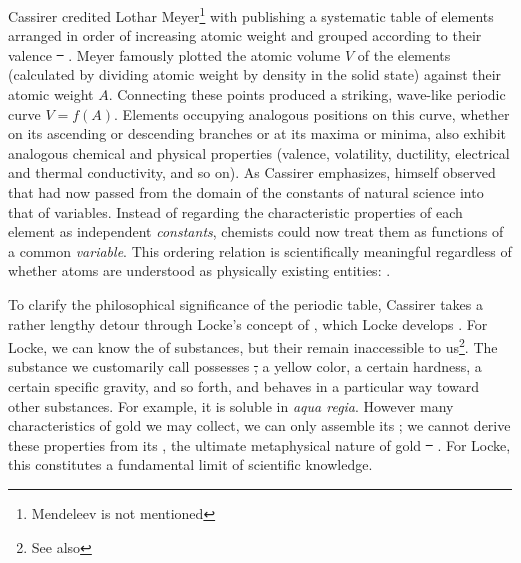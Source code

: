 \documentclass[submitted,12pt]{article}
\providecommand{\DIFadd}[1]{{\protect\color{blue}\uwave{#1}}} %
\providecommand{\DIFdel}[1]{{\protect\color{red}\sout{#1}}}                      %
\providecommand{\DIFaddbegin}{} %
\providecommand{\DIFaddend}{} %
\providecommand{\DIFdelbegin}{} %
\providecommand{\DIFdelend}{} %
\begin{document}
Cassirer credited Lothar Meyer\footnote{Mendeleev is not mentioned} with publishing a systematic table of elements arranged in order of increasing atomic weight and grouped according to their valence \DIFdelbegin \DIFdel{\mbox{%
\citep[see][e.g.]{Arnesano2025}}\hskip0pt%
}\DIFdelend \DIFaddbegin \DIFadd{\mbox{%
\citep[see, e.g.][]{Arnesano2025}}\hskip0pt%
}\DIFaddend . Meyer famously plotted the atomic volume $V$ of the elements (calculated by dividing atomic weight by density in the solid state) against their atomic weight $A$. Connecting these points produced a striking, wave-like periodic curve $V=f(A)$. Elements occupying analogous positions on this curve, whether on its ascending or descending branches or at its maxima or minima, also exhibit analogous chemical and physical properties (valence, volatility, ductility, electrical and thermal conductivity, and so on). As Cassirer emphasizes, \citet[176]{Meyer1884} himself observed that  had now passed from the domain of the constants of natural science into that of variables. Instead of regarding the characteristic properties of each element as independent \emph{constants}, chemists could now treat them as functions of a common \emph{variable}. This ordering relation is scientifically meaningful regardless of whether atoms are understood as physically existing entities:  .

To clarify the philosophical significance of the periodic table, Cassirer takes a rather lengthy detour through Locke's concept of , which Locke develops  . For Locke, we can know the  of substances, but their  remain inaccessible to us\footnote{See also }. The substance we customarily call  possesses \DIFdelbegin \DIFdel{, }\DIFdelend a yellow color, a certain hardness, a certain specific gravity, and so forth, and behaves in a particular way toward other substances. For example, it is soluble in \textit{aqua regia}. However many characteristics of gold we may collect, we can only assemble its ; we cannot derive these properties from its , the ultimate metaphysical nature of gold \DIFdelbegin \DIFdel{\mbox{%
\citep[see][6.III]{Cassirer1907}}\hskip0pt%
}\DIFdelend \DIFaddbegin \DIFadd{\mbox{%
\citep[see][6.III]{Cassirer1907b}}\hskip0pt%
}\DIFaddend . For Locke, this constitutes a fundamental limit of scientific knowledge. 
\end{document}
